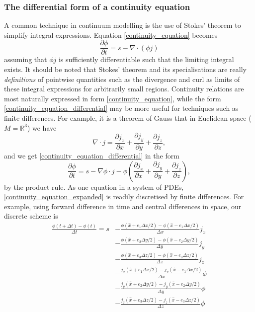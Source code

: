 \documentclass[11pt,a4paper]{memoir}
\newcommand{\Part}[2]{\frac{\partial #1}{\partial #2}}
\begin{document}
\subsubsection{The differential form of a continuity equation}
A common technique in continuum modelling is the use of Stokes' theorem to simplify integral expressions.
Equation \eqref{continuity_equation} becomes
\begin{equation}\label{continuity_equation_differential}
    \Part{\phi}{t} = s - \nabla\cdot (\phi j)
\end{equation}
assuming that $\phi j$ is sufficiently differentiable such that the limiting integral exists.
It should be noted that Stokes' theorem and its specialisations are really \textit{definitions} of pointwise quantities
such as the divergence and curl as limits of these integral expressions for arbitrarily small regions.
Continuity relations are most naturally expressed in form \eqref{continuity_equation}, while the form
\eqref{continuity_equation_differential} may be more useful for techniques such as finite differences.
For example, it is a theorem of Gauss that in Euclidean space ($M = \mathbb{R}^3$) we have
\begin{equation}\label{gauss_euclidean_divergence}
    \nabla \cdot j = \Part{j_x}{x} + \Part{j_y}{y} + \Part{j_z}{z},
\end{equation}
and we get \eqref{continuity_equation_differential} in the form
\begin{equation}\label{continuity_equation_expanded}
    \Part{\phi}{t} = s - \nabla \phi \cdot j - \phi\left(\Part{j_x}{x} + \Part{j_y}{y} + \Part{j_z}{z}\right),
\end{equation}
by the product rule.
As one equation in a system of PDEs, \eqref{continuity_equation_expanded} is readily discretised by finite differences. For example, using forward difference in time and
central differences in space, our discrete scheme is
\begin{equation}\label{continuity_equation_finite_differences}
\begin{split}
    \frac{\phi(t + \Delta t) - \phi(t)}{\Delta t} = s &-\frac{\phi(\hat{x} + e_1\Delta x/2) - \phi(\hat{x} - e_1\Delta x/2)}{\Delta x}j_x \\
                                                      &-\frac{\phi(\hat{x} + e_2\Delta y/2) - \phi(\hat{x} - e_2\Delta y/2)}{\Delta y}j_y \\
                                                      &-\frac{\phi(\hat{x} + e_3\Delta z/2) - \phi(\hat{x} - e_3\Delta z/2)}{\Delta z}j_z \\
                                                      &-\frac{j_x(\hat{x} + e_1\Delta x/2) - j_x(\hat{x} - e_1\Delta x/2)}{\Delta x}\phi \\
                                                      &-\frac{j_y(\hat{x} + e_2\Delta y/2) - j_y(\hat{x} - e_2\Delta y/2)}{\Delta y}\phi \\
                                                      &-\frac{j_z(\hat{x} + e_3\Delta z/2) - j_z(\hat{x} - e_3\Delta z/2)}{\Delta z}\phi
\end{split}
\end{equation}
\end{document}
